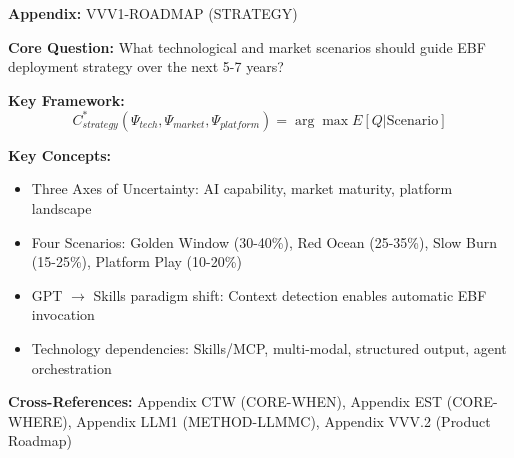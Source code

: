 \begin{tcolorbox}[colback=blue!5!white, colframe=blue!75!black,
    title=Quick Reference: Technological Roadmap]
\textbf{Appendix:} VVV1-ROADMAP (STRATEGY)


\textbf{Core Question:} What technological and market scenarios should guide
EBF deployment strategy over the next 5-7 years?

\textbf{Key Framework:}
\begin{equation}
C^*_{strategy}(\Psi_{tech}, \Psi_{market}, \Psi_{platform}) = \arg\max E[Q | \text{Scenario}]
\end{equation}

\textbf{Key Concepts:}
\begin{itemize}[nosep]
\item Three Axes of Uncertainty: AI capability, market maturity, platform landscape
\item Four Scenarios: Golden Window (30-40\%), Red Ocean (25-35\%), Slow Burn (15-25\%), Platform Play (10-20\%)
\item GPT $\to$ Skills paradigm shift: Context detection enables automatic EBF invocation
\item Technology dependencies: Skills/MCP, multi-modal, structured output, agent orchestration
\end{itemize}

\textbf{Cross-References:} Appendix CTW (CORE-WHEN), Appendix EST (CORE-WHERE),
Appendix LLM1 (METHOD-LLMMC), Appendix VVV.2 (Product Roadmap)
\end{tcolorbox}


